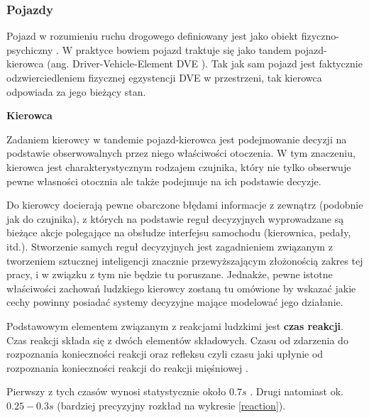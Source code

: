 {\subsubsection{Pojazdy}
\par{
Pojazd w rozumieniu ruchu drogowego definiowany jest jako obiekt fizyczno-psychiczny \cite{TrafficSimulation}. W praktyce bowiem pojazd traktuje się jako tandem pojazd-kierowca (ang. Driver-Vehicle-Element DVE \cite{TrafficSimulation}). Tak jak sam pojazd jest faktycznie odzwierciedleniem fizycznej egzystencji DVE w przestrzeni, tak kierowca odpowiada za jego bieżący stan.
}
\par{ }
\par{
\textbf{Kierowca}
}
\par{
Zadaniem kierowcy w tandemie pojazd-kierowca jest podejmowanie decyzji na podstawie obserwowalnych przez niego właściwości otoczenia. W tym znaczeniu, kierowca jest charakterystycznym rodzajem czujnika, który nie tylko obserwuje pewne własności otocznia ale także podejmuje na ich podstawie decyzje.
}
\par{
Do kierowcy docierają pewne obarczone błędami informacje z zewnątrz (podobnie jak do czujnika), z których na podstawie reguł decyzyjnych wyprowadzane są bieżące akcje polegające na obsłudze interfejsu samochodu (kierownica, pedały, itd.). Stworzenie samych reguł decyzyjnych jest zagadnieniem związanym z tworzeniem sztucznej inteligencji znacznie przewyższającym złożonością zakres tej pracy, i w związku z tym nie będzie tu poruszane. Jednakże, pewne istotne właściwości zachowań ludzkiego kierowcy zostaną tu omówione by wskazać jakie cechy powinny posiadać systemy decyzyjne mające modelować jego działanie.
}
\par{
Podstawowym elementem związanym z reakcjami ludzkimi jest \textbf{czas reakcji}. Czas reakcji składa się z dwóch elementów składowych. Czasu od zdarzenia do rozpoznania konieczności reakcji oraz refleksu czyli czasu jaki upłynie od rozpoznania konieczności reakcji do reakcji mięśniowej \cite{Zatrzymac}.
}
\par{
Pierwszy z tych czasów wynosi statystycznie około $0.7s$ \cite{Zatrzymac}. Drugi natomiast ok. $0.25-0.3s$ \cite{Zatrzymac, ReactionTime} (bardziej precyzyjny rozkład na wykresie \ref{reaction}).
}
\begin{figure}[htb]
    \begin{center}

\end{center}
\end{figure}}
